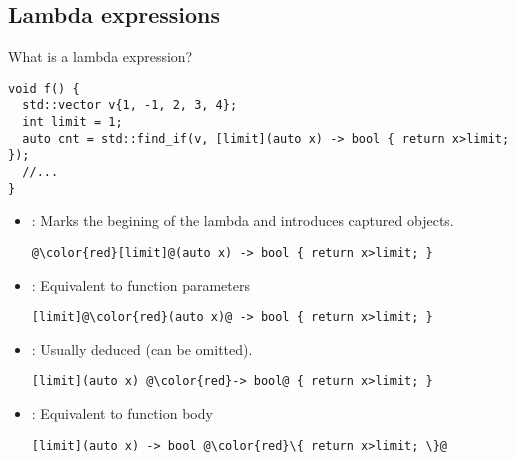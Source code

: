 \subsection{Lambda expressions}

\begin{frame}[t,fragile]{What is a lambda expression?}
\begin{lstlisting}
void f() {
  std::vector v{1, -1, 2, 3, 4};
  int limit = 1;
  auto cnt = std::find_if(v, [limit](auto x) -> bool { return x>limit; });
  //...
}
\end{lstlisting}
\begin{itemize}
  \item {}: Marks the begining of the lambda and introduces
        captured objects.
\begin{lstlisting}[escapechar=@]
@\color{red}[limit]@(auto x) -> bool { return x>limit; }
\end{lstlisting}

  \item {}: Equivalent to function parameters
\begin{lstlisting}[escapechar=@]
[limit]@\color{red}(auto x)@ -> bool { return x>limit; }
\end{lstlisting}

  \item {}: Usually deduced (can be omitted).
\begin{lstlisting}[escapechar=@]
[limit](auto x) @\color{red}-> bool@ { return x>limit; }
\end{lstlisting}

  \item {}: Equivalent to function body
\begin{lstlisting}[escapechar=@]
[limit](auto x) -> bool @\color{red}\{ return x>limit; \}@
\end{lstlisting}

\end{itemize}
\end{frame}

